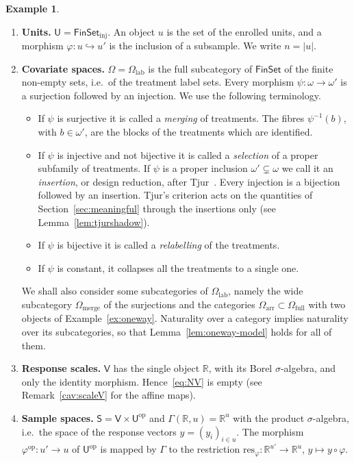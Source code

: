 \documentclass[11pt,a4paper]{article}
\theoremstyle{plain}
\theoremstyle{definition}
\newtheorem{example}[theorem]{Example}
\theoremstyle{remark}
\newcommand{\cat}[1]{\mathsf{#1}}
\newcommand{\catU}{\cat{U}}
\newcommand{\catV}{\cat{V}}
\newcommand{\catO}{\cat{\Omega}}
\newcommand{\catS}{\cat{S}}
\newcommand{\FinSet}{\cat{FinSet}}
\newcommand{\op}{\mathrm{op}}
\newcommand{\R}{\mathbb{R}}
\newcommand{\res}{\mathrm{res}}
\begin{document}
\begin{example}\label{ex:oneway-setup}
\leavevmode
\begin{enumerate}
\item \textbf{Units.} $\catU = \FinSet_{\mathrm{inj}}$. An object $u$ is the
set of the enrolled units, and a morphism
$\varphi \colon u \hookrightarrow u'$ is the inclusion of a subsample. We write
$n = |u|$.

\item \textbf{Covariate spaces.} $\catO = \catO_{\mathrm{lab}}$ is the full
subcategory of $\FinSet$ of the finite non-empty sets, i.e.\ of the treatment
label sets. Every morphism $\psi \colon \omega \to \omega'$ is a surjection
followed by an injection. We use the following terminology.
\begin{itemize}
\item If $\psi$ is surjective it is called a \emph{merging} of treatments. The
fibres $\psi^{-1}(b)$, with $b \in \omega'$, are the blocks of the treatments
which are identified.
\item If $\psi$ is injective and not bijective it is called a \emph{selection}
of a proper subfamily of treatments. If $\psi$ is a proper inclusion
$\omega' \subsetneq \omega$ we call it an \emph{insertion}, or design
reduction, after Tjur~\cite[p.~1299]{tjur_discussion_2002}. Every injection is
a bijection followed by an insertion. Tjur's criterion acts on the quantities
of Section~\ref{sec:meaningful} through the insertions only (see
Lemma~\ref{lem:tjurshadow}).
\item If $\psi$ is bijective it is called a \emph{relabelling} of the
treatments.
\item If $\psi$ is constant, it collapses all the treatments to a single one.
\end{itemize}
We shall also consider some subcategories of $\catO_{\mathrm{lab}}$, namely the
wide subcategory $\catO_{\mathrm{merge}}$ of the surjections and the
categories $\catO_{\mathrm{arr}} \subset \catO_{\mathrm{full}}$ with two
objects of Example~\ref{ex:oneway}. Naturality over a category implies
naturality over its subcategories, so that Lemma~\ref{lem:oneway-model} holds
for all of them.

\item \textbf{Response scales.} $\catV$ has the single object $\R$, with its
Borel $\sigma$-algebra, and only the identity morphism. Hence~\eqref{eq:NV} is
empty (see Remark~\ref{cav:scaleV} for the affine maps).

\item \textbf{Sample spaces.} $\catS = \catV \times \catU^{\op}$ and
$\Gamma(\R,u) = \R^{u}$ with the product $\sigma$-algebra, i.e.\ the space of
the response vectors $y = (y_i)_{i \in u}$. The morphism
$\varphi^{\op} \colon u' \to u$ of $\catU^{\op}$ is mapped by $\Gamma$ to the
restriction $\res_{\varphi} \colon \R^{u'} \to \R^{u}$,
$y \mapsto y \circ \varphi$.


\end{enumerate}
\end{example}
\end{document}
